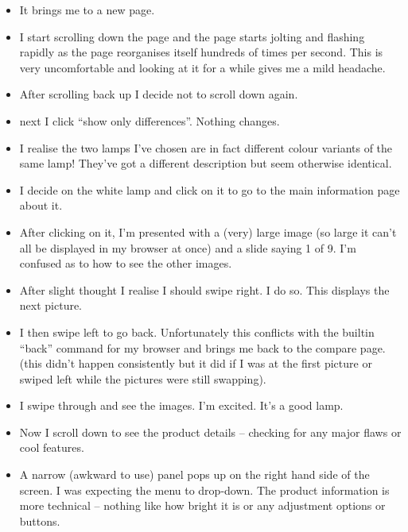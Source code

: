 \documentclass[10pt,\jkfside,a4paper]{article}
\begin{document}
\begin{enumerate}
\begin{itemize}
\item It brings me to a new page.

\item I start scrolling down the page and the page starts jolting and flashing
rapidly as the page reorganises itself hundreds of times per second.
This is very uncomfortable and looking at it for a while gives me a mild
headache.

\item After scrolling back up I decide not to scroll down again.

\item next I click ``show only differences''. Nothing changes.

\item I realise the two lamps I've chosen are in fact different colour variants
of the same lamp! They've got a different description but seem otherwise identical.

\item I decide on the white lamp and click on it to go to the main information page
about it.

\item After clicking on it, I'm presented with a (very) large image (so large
it can't all be displayed in my browser at once) and a slide saying
1 of 9. I'm confused as to how to see the other images.

\item After slight thought I realise I should swipe right. I do so. This displays
the next picture.

\item I then swipe left to go back. Unfortunately this conflicts with the
builtin ``back'' command for my browser and brings me back to the compare
page. (this didn't happen consistently but it did if I was at the first picture
or swiped left while the pictures were still swapping).

\item I swipe through and see the images. I'm excited. It's a good lamp.

\item Now I scroll down to see the product details -- checking for any major flaws
or cool features.

\item A narrow (awkward to use) panel pops up on the right hand side of the screen.
I was expecting the menu to drop-down. The product information is more technical --
nothing like how bright it is or any adjustment options or buttons.


\end{itemize}
\end{enumerate}
\end{document}
